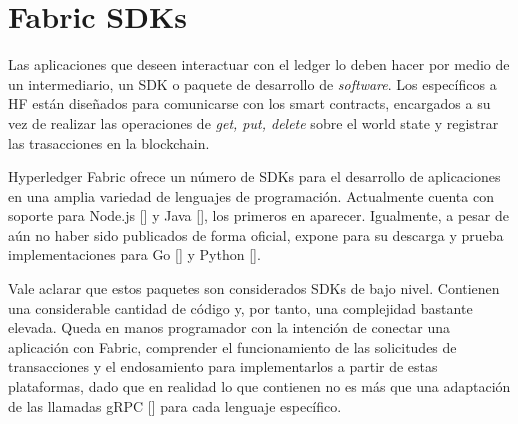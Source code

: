 
\section{Fabric SDKs} 

Las aplicaciones que deseen interactuar con el ledger lo deben hacer por medio de un intermediario, un SDK o paquete de desarrollo de \emph{software}. Los espec\'ificos a HF est\'an dise\~nados para comunicarse con los smart contracts, encargados a su vez de realizar las operaciones de \emph{get, put, delete} sobre el world state y registrar las trasacciones en la blockchain.

Hyperledger Fabric ofrece un n\'umero de SDKs para el desarrollo de aplicaciones en una amplia variedad de lenguajes de programaci\'on. Actualmente cuenta con soporte para Node.js [\cite{SDKNode}] y Java [\cite{SDKJava}], los primeros en aparecer. Igualmente, a pesar de a\'un no haber sido publicados de forma oficial, expone para su descarga y prueba implementaciones para Go [\cite{SDKGO}] y Python [\cite{SDKPython}].

Vale aclarar que estos paquetes son considerados SDKs de bajo nivel. Contienen una considerable cantidad de c\'odigo y, por tanto, una complejidad bastante elevada. Queda en manos programador con la intenci\'on de conectar una aplicaci\'on con Fabric, comprender el funcionamiento de las solicitudes de transacciones y el endosamiento para implementarlos a partir de estas plataformas, dado que en realidad lo que contienen no es m\'as que una adaptaci\'on de las llamadas gRPC [\cite{grpc}] para cada lenguaje espec\'ifico.

